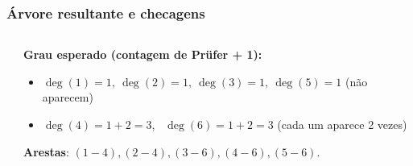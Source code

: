 \documentclass[aspectratio=169]{beamer}
\begin{document}
\begin{frame}[t]
  \frametitle{Árvore resultante e checagens}
  \begin{columns}[T,onlytextwidth]
    \begin{column}{0.62\linewidth}
    \end{column}
    \begin{column}{0.38\linewidth}
      \small
      \textbf{Grau esperado (contagem de Prüfer + 1):}
      \begin{itemize}
        \item $\deg(1)=1,\ \deg(2)=1,\ \deg(3)=1,\ \deg(5)=1$ (não aparecem)\\
        \item $\deg(4)=1+2=3$, \ $\deg(6)=1+2=3$ (cada um aparece 2 vezes)
      \end{itemize}
      \vspace{4pt}
      \textbf{Arestas}: $(1\!-\!4), (2\!-\!4), (3\!-\!6), (4\!-\!6), (5\!-\!6)$.
    \end{column}
  \end{columns}
\end{frame}

\end{document}
